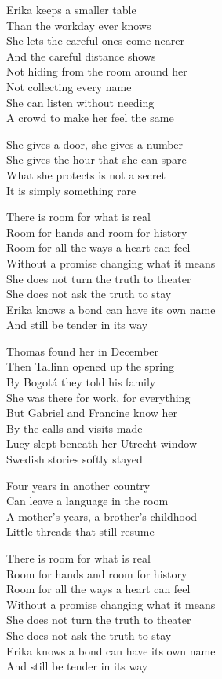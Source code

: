 \begin{lyrics}
Erika keeps a smaller table\\
Than the workday ever knows\\
She lets the careful ones come nearer\\
And the careful distance shows\\
Not hiding from the room around her\\
Not collecting every name\\
She can listen without needing\\
A crowd to make her feel the same

She gives a door, she gives a number\\
She gives the hour that she can spare\\
What she protects is not a secret\\
It is simply something rare

There is room for what is real\\
Room for hands and room for history\\
Room for all the ways a heart can feel\\
Without a promise changing what it means\\
She does not turn the truth to theater\\
She does not ask the truth to stay\\
Erika knows a bond can have its own name\\
And still be tender in its way

Thomas found her in December\\
Then Tallinn opened up the spring\\
By Bogotá they told his family\\
She was there for work, for everything\\
But Gabriel and Francine know her\\
By the calls and visits made\\
Lucy slept beneath her Utrecht window\\
Swedish stories softly stayed

Four years in another country\\
Can leave a language in the room\\
A mother’s years, a brother’s childhood\\
Little threads that still resume

There is room for what is real\\
Room for hands and room for history\\
Room for all the ways a heart can feel\\
Without a promise changing what it means\\
She does not turn the truth to theater\\
She does not ask the truth to stay\\
Erika knows a bond can have its own name\\
And still be tender in its way


\end{lyrics}
